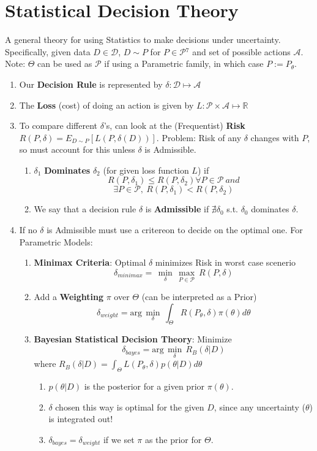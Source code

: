 \documentclass[a4paper,portrait,columns=2, hidelinks]{cheatsheet}
\begin{document}
\section{Statistical Decision Theory}

A general theory for using Statistics to make decisions under uncertainty. Specifically, given data \(D \in \mathcal{D}\), \(D \sim P\) for \(P\in \mathcal{P}\)\hyperref[sec:ft7]{$^7$} and set of possible actions \(\mathcal{A}\). Note: \(\Theta\) can be used as \(\mathcal{P}\) if using a Parametric family, in which case \(P := P_{\theta}\).
 \begin{enumerate}
 	\item Our \textbf{Decision Rule} is represented by \(\delta: \mathcal{D} \mapsto \mathcal{A}\)
 	\item The \textbf{Loss} (cost) of doing an action is given by \(L: \mathcal{P} \times \mathcal{A} \mapsto \mathbb{R}\)
 	\item To compare different \(\delta\)'s, can look at the (Frequentist) \textbf{Risk} \(R(P,\delta)=E_{D\sim P}[L(P,\delta(D))]\). Problem: Risk of any \(\delta\) changes with \(P\), so must account for this unless \(\delta\) is Admissible.
 	\begin{enumerate}
	 	\item \(\delta_1\) \textbf{Dominates} \(\delta_2\) (for given loss function \(L\)) if $$R(P,\delta_1)\leq R(P,\delta_2) \forall P \in \mathcal{P}\ and$$
	 	$$\exists P \in \mathcal{P},\ R(P,\delta_1) < R(P, \delta_2)$$
	 	\item We say that a decision rule $\delta$ is \textbf{Admissible} if $\nexists \delta_0$ s.t. $\delta_0$ dominates $\delta$. 
	\end{enumerate}
	\item If no \(\delta\) is Admissible must use a critereon to decide on the optimal one. For Parametric Models:
 	\begin{enumerate}
 		\item \textbf{Minimax Criteria}: Optimal \(\delta\) minimizes Risk in worst case scenerio 
 		$$\delta_{minimax} = \,\min\limits_{\delta}\,\max\limits_{P \in \mathcal{P}}\ R(P,\delta)$$
 		\item Add a \textbf{Weighting} \(\pi\) over $\Theta$ (can be interpreted as a Prior)
 		$$\delta_{weight}= \text{arg}\,\min\limits_{\delta}\,\int_{\Theta}^{}R(P_\theta,\delta)\pi(\theta)d\theta$$
 		\item \textbf{Bayesian Statistical Decision Theory}: Minimize
 		$$\delta_{bayes}= \text{arg}\,\min\limits_{\delta}\,R_B(\delta|D)$$ where $R_B(\delta|D) = \int_{\Theta}^{}L(P_{\theta},\delta)p(\theta|D)d\theta$
 		\begin{enumerate}
 			\item $p(\theta|D)$ is the posterior for a given prior $\pi(\theta)$.
 			\item \(\delta\) chosen this way is optimal for the given \(D\), since any uncertainty (\(\theta\)) is integrated out!
 			\item \(\delta_{bayes}=\delta_{weight}\) if we set \(\pi\) as the prior for \(\Theta\).
 		\end{enumerate}
 	\end{enumerate}
\end{enumerate}
\end{document}
